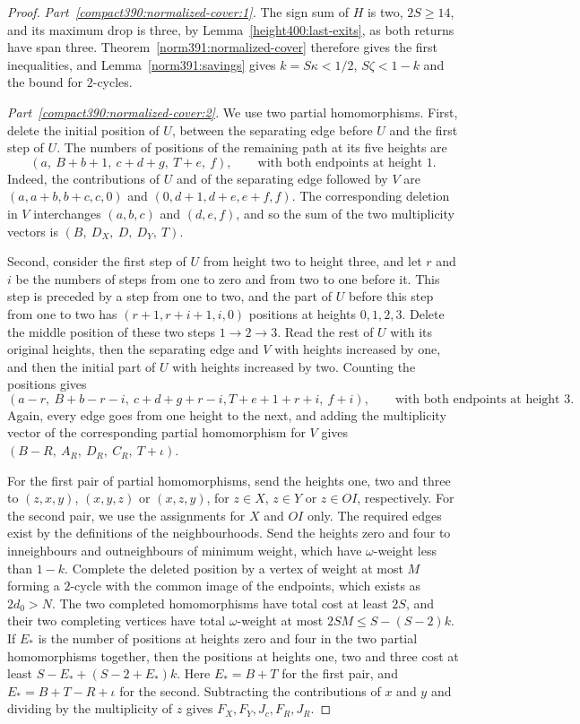 \begin{proof}
\emph{Part~\ref{compact390:normalized-cover:1}.} The sign sum of $H$ is two, $2S\ge14$, and its maximum drop is three, by Lemma~\ref{height400:last-exits}, as both returns have span three. Theorem~\ref{norm391:normalized-cover}
therefore gives the first inequalities, and Lemma~\ref{norm391:savings}
gives $k=S\kappa<1/2$, $S\zeta<1-k$ and the bound for $2$-cycles.

\emph{Part~\ref{compact390:normalized-cover:2}.} We use two partial homomorphisms. First, delete the initial position of $U$, between the separating edge before $U$
and the first step of $U$. The numbers of positions of the remaining path at its five
heights are
\[
 (a,\ B+b+1,\ c+d+g,\ T+e,\ f),
 \qquad\text{with both endpoints at height }1.
\]
Indeed, the contributions of $U$ and of the separating edge followed by $V$ are
$(a,a+b,b+c,c,0)$ and $(0,d+1,d+e,e+f,f)$.
The corresponding deletion in $V$ interchanges $(a,b,c)$ and
$(d,e,f)$, and so the sum of the two multiplicity vectors is $(B,\ D_X,\ D,\ D_Y,\ T)$.

Second, consider the first step of $U$ from height two to height three, and let $r$ and $i$ be the numbers of steps from one to zero and from two to one before it. This step is preceded by a step from one to two, and the part of $U$ before this step from one to two has
$(r+1,r+i+1,i,0)$ positions at heights $0,1,2,3$. Delete the middle
position of these two steps $1\to2\to3$. Read the rest of $U$ with its original heights, then
the separating edge and $V$ with heights increased by one, and then the initial part of $U$ with heights increased by two. Counting the positions gives
\[
 (a-r,\ B+b-r-i,\ c+d+g+r-i,
                     T+e+1+r+i,\ f+i),
 \qquad\text{with both endpoints at height }3.
\]
Again, every edge goes from one height to the next, and adding the multiplicity vector of the corresponding partial homomorphism
for $V$ gives $(B-R,\ A_R,\ D_R,\ C_R,\ T+\iota)$.

For the first pair of partial homomorphisms, send the heights one, two and three to
$(z,x,y)$, $(x,y,z)$ or $(x,z,y)$, for $z\in X$, $z\in Y$ or $z\in OI$, respectively.
For the second pair, we use the assignments for $X$ and $OI$ only. The required
edges exist by the definitions of the neighbourhoods. Send the heights zero
and four to inneighbours and outneighbours of minimum weight, which have $\omega$-weight less than $1-k$. Complete the deleted position by a vertex of weight at most $M$ forming a $2$-cycle with the common image of the endpoints, which exists as $2d_0>N$.
The two completed homomorphisms have total cost at least $2S$, and their two
completing vertices have total $\omega$-weight at most $2SM\le S-(S-2)k$.
If $E_*$ is the number of positions at heights zero and four in the two partial homomorphisms together, then the positions at heights one, two and three cost at least $S-E_*+(S-2+E_*)k$. Here $E_*=B+T$ for the first pair, and $E_*=B+T-R+\iota$ for the
second. Subtracting the contributions of $x$ and $y$ and dividing by the
multiplicity of $z$ gives $F_X,F_Y,J_c,F_R,J_R$.


\end{proof}
